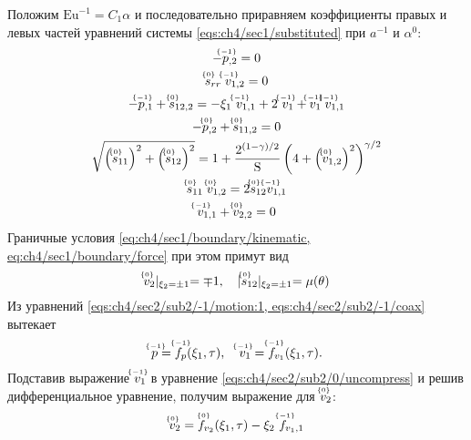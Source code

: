 Положим $\text{Eu}^{-1} = C_1 \alpha$ и последовательно приравняем коэффициенты правых и левых частей уравнений системы \cref{eqs:ch4/sec1/substituted} при $a^{-1}$ и $\alpha^0$:
\begin{subequations}
  \label{eqs:ch4/sec2/sub2/main}
  \begin{gather}
    \label{eqs:ch4/sec2/sub2/-1/motion:1}
    -\uindex{p}{-1}_{,2} = 0
    \\
    \label{eqs:ch4/sec2/sub2/-1/coax}
    \uindex{s}{0}_{rr} \; \uindex{v}{-1}_{1,2} = 0
    \\
    \label{eqs:ch4/sec2/sub2/0/motion:1}
    -\uindex{p}{-1}_{,1} + \uindex{s}{0}_{12,2} = -\xi_1 \ \uindex{v}{-1}_{1,1} + 2 \ \uindex{v}{-1}_{1} + \uindex{v}{-1}_{1} \; \uindex{v}{-1}_{1,1}
    \\
    \label{eqs:ch4/sec2/sub2/0/motion:2}
    -\uindex{p}{0}_{,2} + \uindex{s}{0}_{11,2} = 0
    \\
    \label{eqs:ch4/sec2/sub2/0/plasticity}
    \sqrt{\left(\uindex{s}{0}_{11}\right)^2 + \left(\uindex{s}{0}_{12}\right)^2} = 1 + \frac{2^{(1-\gamma)/2}}{\text{S}} \left(4+\left(\uindex{v}{0}_{1,2}\right)^2\right)^{\gamma/2}
    \\
    \label{eqs:ch4/sec2/sub2/0/coax}
    \uindex{s}{0}_{11} \; \uindex{v}{0}_{1,2} = 2 \uindex{s}{0}_{12} \uindex{v}{-1}_{1,1}
    \\
    \label{eqs:ch4/sec2/sub2/0/uncompress}
    \uindex{v}{-1}_{1,1} + \uindex{v}{0}_{2,2} = 0
  \end{gather}
\end{subequations}
Граничные условия \cref{eq:ch4/sec1/boundary/kinematic, eq:ch4/sec1/boundary/force} при этом примут вид
\begin{equation}
  \label{eq:ch4/sec2/sub2/boundary/0}
  \uindex{v}{0}_{2}\lvert_{\xi_2=\pm 1} = \mp 1, \quad \lvert \uindex{s}{0}_{12}\lvert_{\xi_2=\pm 1} = \mu(\theta)
\end{equation}
Из уравнений \cref{eqs:ch4/sec2/sub2/-1/motion:1, eqs:ch4/sec2/sub2/-1/coax} вытекает
\begin{equation*}
  \uindex{p}{-1} = \uindex{f}{-1}_{p}(\xi_1, \tau), \quad \uindex{v}{-1}_{1} = \uindex{f}{-1}_{v_{1}}(\xi_1, \tau).
\end{equation*}
Подставив выражение $\uindex{v}{-1}_{1}$ в уравнение \cref{eqs:ch4/sec2/sub2/0/uncompress} и решив дифференциальное уравнение, получим выражение для $\uindex{v}{0}_{2}$:
\begin{equation*}
  \uindex{v}{0}_{2} = \uindex{f}{0}_{v_{2}}(\xi_1, \tau) - \xi_2 \ \uindex{f}{-1}_{v_{1},1}
\end{equation*}
